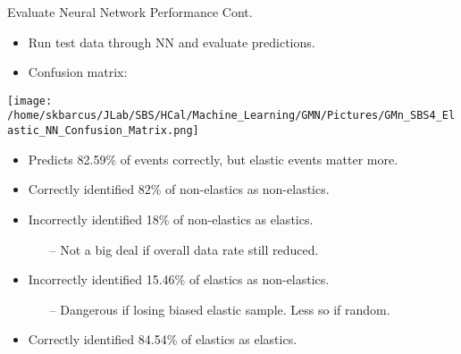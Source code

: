 \documentclass[10pt]{beamer}
\begin{document}
\begin{frame}{Evaluate Neural Network Performance Cont.}
	\vspace{-2mm}
	\begin{itemize}
		\item Run test data through NN and evaluate predictions.
		\item Confusion matrix:
	\end{itemize}
	
	\begin{center}
    		\texttt{[image: /home/skbarcus/JLab/SBS/HCal/Machine\_Learning/GMN/Pictures/GMn\_SBS4\_Elastic\_NN\_Confusion\_Matrix.png]}
    	\end{center}
    	
    	\vspace{-5mm}
	\begin{itemize}
		\item \alert{Predicts 82.59\% of events correctly, but elastic events matter more.}
		\item Correctly identified  82\% of non-elastics as non-elastics.
		\item Incorrectly identified 18\% of non-elastics as elastics.
		\begin{itemize}
			\item[--] Not a big deal if overall data rate still reduced.
		\end{itemize}
		\item {}\alert{Incorrectly identified  15.46\% of elastics as non-elastics.}
		\begin{itemize}
			\item[--] Dangerous if losing biased elastic sample. Less so if random.
		\end{itemize}
		\item {}\alert{Correctly identified  84.54\% of elastics as elastics.}
	\end{itemize}
	
\end{frame}
\end{document}
